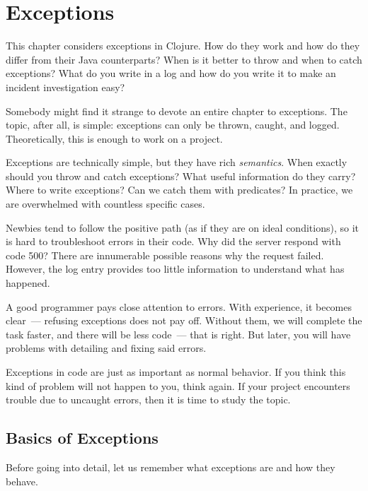 \chapter{Exceptions}


\begin{teaser}
This chapter considers exceptions in Clojure. How do they work and how do they differ from their Java counterparts? When is it better to throw and when to catch exceptions? What do you write in a log and how do you write it to make an incident investigation easy?
\end{teaser}

Somebody might find it strange to devote an entire chapter to exceptions. The topic, after all, is simple: exceptions can only be thrown, caught, and logged. Theoretically, this is enough to work on a project.

Exceptions are technically simple, but they have rich \emph{semantics}. When exactly should you throw and catch exceptions? What useful information do they carry? Where to write exceptions? Can we catch them with predicates? In practice, we are overwhelmed with countless specific cases.

Newbies tend to follow the positive path (as if they are on ideal conditions), so it is hard to troubleshoot errors in their code. Why did the server respond with code 500? There are innumerable possible reasons why the request failed. However, the log entry provides too little information to understand what has happened.

A good programmer pays close attention to errors. With experience, it becomes clear~--- refusing exceptions does not pay off. Without them, we will complete the task faster, and there will be less code~--- that is right. But later, you will have problems with detailing and fixing said errors.

Exceptions in code are just as important as normal behavior. If you think this kind of problem will not happen to you, think again. If your project encounters trouble due to uncaught errors, then it is time to study the topic.

\section{Basics of Exceptions}


Before going into detail, let us remember what exceptions are and how they behave.

